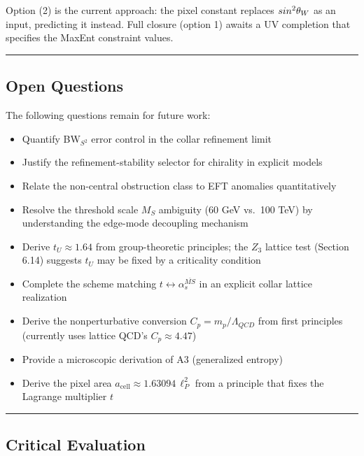 \documentclass[11pt,a4paper]{article}
\theoremstyle{remark}
\providecommand{\tightlist}{%
  \setlength{\itemsep}{0pt}\setlength{\parskip}{0pt}}
\begin{document}
Option (2) is the current approach: the pixel constant replaces \(sin\textsuperscript{2}\ensuremath{\theta}_W\) as an input, predicting it instead. Full closure (option 1) awaits a UV completion that specifies the MaxEnt constraint values.

\begin{center}\rule{0.5\linewidth}{0.5pt}\end{center}

\subsection{Open Questions}\label{open-questions}

The following questions remain for future work:

\begin{itemize}
\tightlist
\item
  Quantify BW\(_{S^2}\) error control in the collar refinement limit
\item
  Justify the refinement-stability selector for chirality in explicit models
\item
  Relate the non-central obstruction class to EFT anomalies quantitatively
\item
  Resolve the threshold scale \(M_S\) ambiguity (60 GeV vs.~100 TeV) by understanding the edge-mode decoupling mechanism
\item
  Derive \(t_U \approx 1.64\) from group-theoretic principles; the \(Z_3\) lattice test (Section 6.14) suggests \(t_U\) may be fixed by a criticality condition
\item
  Complete the scheme matching \(t \leftrightarrow \alpha_s^{\overline{MS}}\) in an explicit collar lattice realization
\item
  Derive the nonperturbative conversion \(C_p = m_p/\Lambda_{QCD}\) from first principles (currently uses lattice QCD's \(C_p \approx 4.47\))
\item
  Provide a microscopic derivation of A3 (generalized entropy)
\item
  Derive the pixel area \(a_\mathrm{cell} \approx 1.63094\,\ell_P^2\) from a principle that fixes the Lagrange multiplier \(t\)
\end{itemize}

\begin{center}\rule{0.5\linewidth}{0.5pt}\end{center}

\subsection{Critical Evaluation}\label{critical-evaluation}
\end{document}
